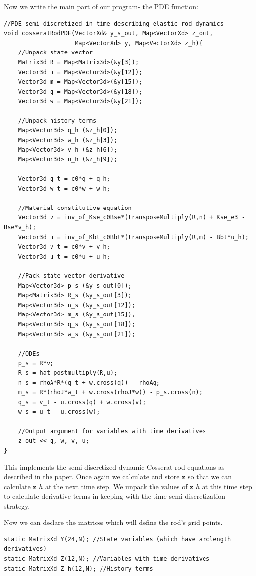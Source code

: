 \documentclass[12pt]{article}
\begin{document}
\newpage \noindent
Now we write the main part of our program- the PDE function:
\begin{lstlisting}
//PDE semi-discretized in time describing elastic rod dynamics
void cosseratRodPDE(VectorXd& y_s_out, Map<VectorXd> z_out,
                    Map<VectorXd> y, Map<VectorXd> z_h){
    //Unpack state vector
    Matrix3d R = Map<Matrix3d>(&y[3]);
    Vector3d n = Map<Vector3d>(&y[12]);
    Vector3d m = Map<Vector3d>(&y[15]);
    Vector3d q = Map<Vector3d>(&y[18]);
    Vector3d w = Map<Vector3d>(&y[21]);

    //Unpack history terms
    Map<Vector3d> q_h (&z_h[0]);
    Map<Vector3d> w_h (&z_h[3]);
    Map<Vector3d> v_h (&z_h[6]);
    Map<Vector3d> u_h (&z_h[9]);

    Vector3d q_t = c0*q + q_h;
    Vector3d w_t = c0*w + w_h;

    //Material constitutive equation
    Vector3d v = inv_of_Kse_c0Bse*(transposeMultiply(R,n) + Kse_e3 - Bse*v_h);
    Vector3d u = inv_of_Kbt_c0Bbt*(transposeMultiply(R,m) - Bbt*u_h);
    Vector3d v_t = c0*v + v_h;
    Vector3d u_t = c0*u + u_h;

    //Pack state vector derivative
    Map<Vector3d> p_s (&y_s_out[0]);
    Map<Matrix3d> R_s (&y_s_out[3]);
    Map<Vector3d> n_s (&y_s_out[12]);
    Map<Vector3d> m_s (&y_s_out[15]);
    Map<Vector3d> q_s (&y_s_out[18]);
    Map<Vector3d> w_s (&y_s_out[21]);

    //ODEs
    p_s = R*v;
    R_s = hat_postmultiply(R,u);
    n_s = rhoA*R*(q_t + w.cross(q)) - rhoAg;
    m_s = R*(rhoJ*w_t + w.cross(rhoJ*w)) - p_s.cross(n);
    q_s = v_t - u.cross(q) + w.cross(v);
    w_s = u_t - u.cross(w);

    //Output argument for variables with time derivatives
    z_out << q, w, v, u;
}
\end{lstlisting}
This implements the semi-discretized dynamic Cosserat rod equations as described in the paper. Once again we calculate and store $\boldsymbol{z}$ so that we can calculate $\boldsymbol{z}\_h$ at the next time step. We unpack the values of $\boldsymbol{z}\_h$ at this time step to calculate derivative terms in keeping with the time semi-discretization strategy.

Now we can declare the matrices which will define the rod's grid points.
\begin{lstlisting}
static MatrixXd Y(24,N); //State variables (which have arclength derivatives)
static MatrixXd Z(12,N); //Variables with time derivatives
static MatrixXd Z_h(12,N); //History terms
\end{lstlisting}
\end{document}
